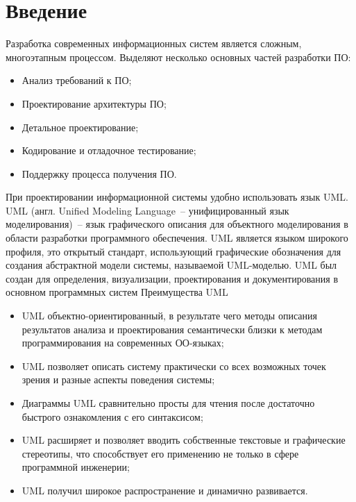 ﻿\section{Введение}
  Разработка современных информационных систем является сложным, многоэтапным процессом. 
  Выделяют несколько основных частей разработки ПО:
  \begin{itemize}
		\item Анализ требований к ПО;
		\item Проектирование архитектуры ПО;
    \item Детальное проектирование;
    \item Кодирование и отладочное тестирование;
    \item Поддержку процесса получения ПО.
  \end{itemize} 
  При проектировании информационной системы удобно использовать язык UML.
  UML (англ. Unified Modeling Language~-- унифицированный язык моделирования)~-- язык графического описания для   
объектного моделирования в области разработки программного обеспечения. UML является языком широкого профиля, это 
открытый стандарт, использующий графические обозначения для создания абстрактной модели системы, называемой 
UML-моделью. UML был создан для определения, визуализации, проектирования и документирования в основном программных систем
  Преимущества UML
  \begin{itemize}
    \item UML объектно-ориентированный, в результате чего методы описания результатов анализа и проектирования семантически близки к методам программирования на современных ОО-языках;
    \item UML позволяет описать систему практически со всех возможных точек зрения и разные аспекты поведения системы;
    \item Диаграммы UML сравнительно просты для чтения после достаточно быстрого ознакомления с его синтаксисом;
    \item UML расширяет и позволяет вводить собственные текстовые и графические стереотипы, что способствует его применению не только в сфере программной инженерии;
    \item UML получил широкое распространение и динамично развивается.
  \end{itemize}
\newpage
\endinput


